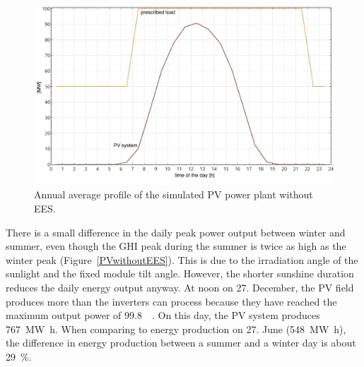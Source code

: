 \begin{figure}[htbp]  
\centering
\includegraphics[width=0.9\linewidth]{FIG/PVwithoutEESanual}
\caption[Annual average profile of the simulated PV power plant without EES.]{Annual average profile of the simulated PV power plant without EES.}\label{PVwithoutEESanual}
\end{figure}

There is a small difference in the daily peak power output between winter and summer, even though the GHI peak during the summer is twice as high as the winter peak (Figure~\ref{PVwithoutEES}). This is due to the irradiation angle of the sunlight and the fixed module tilt angle. However, the shorter sunshine duration reduces the daily energy output anyway. At noon on 27. December, the PV field produces more than the inverters can process because they have reached the maximum output power of \SI{99.8}{\mega\wattsac}. On this day, the PV system produces \SI{767}{\mega\watt\hour}. When comparing to energy production on 27. June (\SI{548}{\mega\watt\hour}), the difference in energy production between a summer and a winter day is about \SI{29}{\percent}.


